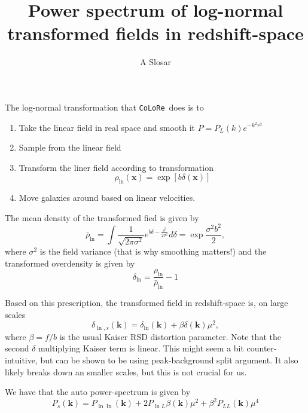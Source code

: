 \documentclass[12pt]{article}
\newcommand{\colore}{\texttt{CoLoRe}}
\newcommand{\vx}{\textbf{x}}
\newcommand{\vk}{\textbf{k}}
\begin{document}
\title{Power spectrum of log-normal transformed fields in
  redshift-space}
\author{A Slosar}
\maketitle

The log-normal transformation that \colore\ does is to 
\begin{enumerate}
\item Take the linear field in real space and smooth it
  $P=P_L(k)e^{-k^2r^2}$
\item Sample from the linear field
\item Transform the liner field according to transformation
  \begin{equation}
    \rho_{\ln}(\vx) = \exp\left[b\delta(\vx)\right]
  \end{equation}
\item Move galaxies around based on linear velocities.
\end{enumerate}

The mean density of the transformed fied is given by
\begin{equation}
  \bar{\rho}_{\ln} = \int \frac{1}{\sqrt{2\pi\sigma^2}}e^{b\delta -
    \frac{\delta^2}{2\sigma^2}} d \delta= \exp{\frac{\sigma^2b^2}{2}},
\end{equation}
where $\sigma^2$ is the field variance (that is why smoothing
matters!) and the transformed overdensity is given by 
\begin{equation}
  \delta_{\ln} = \frac{\rho_{\ln}}{\bar{\rho}_{\ln}} -1 
\end{equation}



Based on this prescription, the transformed field in redshift-space
is, on large scales
\begin{equation}
  \delta_{\ln,s}(\vk) = \delta_{\ln}(\vk) + \beta \delta (\vk) \mu^2,
\end{equation}
where $\beta=f/b$ is the usual Kaiser RSD distortion parameter. Note
that the second $\delta$ multiplying Kaiser term is linear. This
might seem a bit counter-intuitive, but can be shown to be using
peak-background split argument. It also likely breaks down an smaller
scales, but this is not crucial for us.

We have that the auto power-spectrum is given by 
\begin{equation}
  P_s(\vk) = P_{\ln\ln}(\vk) + 2P_{\ln L}\beta (\vk)\mu^2 + \beta^2 P_{LL}(\vk)\mu^4
\end{equation}
\end{document}
